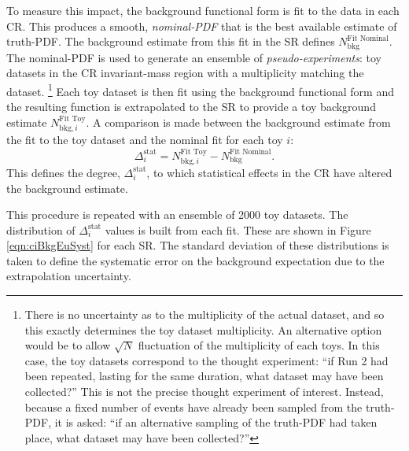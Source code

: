 To measure this impact, the background functional form is fit to the data in each CR.
This produces a smooth, \emph{nominal-PDF} that is the best available estimate of truth-PDF.
The background estimate from this fit in the SR defines $N_\text{bkg}^\text{Fit Nominal}$.
The nominal-PDF is used to generate an ensemble of \emph{pseudo-experiments}: toy datasets in the CR invariant-mass region with a multiplicity matching the dataset.
\footnote{There is no uncertainty as to the multiplicity of the actual dataset, and so this exactly determines the toy dataset multiplicity. An alternative option would be to allow $\sqrt{N}$ fluctuation of the multiplicity of each toys. In this case, the toy datasets correspond to the thought experiment: ``if Run 2 had been repeated, lasting for the same duration, what dataset may have been collected?'' This is not the precise thought experiment of interest. Instead, because a fixed number of events have already been sampled from the truth-PDF, it is asked: ``if an alternative sampling of the truth-PDF had taken place, what dataset may have been collected?''}
Each toy dataset is then fit using the background functional form and the resulting function is extrapolated to the SR to provide a toy background estimate $N_{\text{bkg},i}^\text{Fit Toy}$.
A comparison is made between the background estimate from the fit to the toy dataset and the nominal fit for each toy $i$:
\begin{equation*}
    \Delta_i^\text{stat}=N_{\text{bkg},i}^\text{Fit Toy}-N_\text{bkg}^\text{Fit Nominal}.
\end{equation*}
This defines the degree, $\Delta_i^\text{stat}$, to which statistical effects in the CR have altered the background estimate.


This procedure is repeated with an ensemble of 2000 toy datasets.
The distribution of $\Delta_i^\text{stat}$ values is built from each fit. These are shown in Figure \ref{eqn:ciBkgEuSyst} for each SR.
The standard deviation of these distributions is taken to define the systematic error on the background expectation due to the extrapolation uncertainty.

